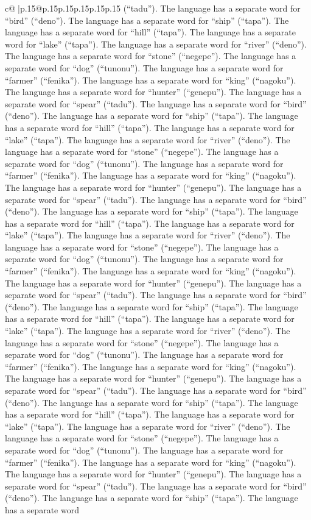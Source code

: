 \documentclass{article}
\begin{document}
{\begin{supertabular}{c@{$\;$}|p{.15\linewidth}@{}p{.15\linewidth}p{.15\linewidth}p{.15\linewidth}p{.15\linewidth}p{.15\linewidth}}
{{{(“tadu”). The language has a separate word for “bird” (“deno”). The language has a separate word for “ship” (“tapa”). The language has a separate word for “hill” (“tapa”). The language has a separate word for “lake” (“tapa”). The language has a separate word for “river” (“deno”). The language has a separate word for “stone” (“negepe”). The language has a separate word for “dog” (“tunonu”). The language has a separate word for “farmer” (“fenika”). The language has a separate word for “king” (“nagoku”). The language has a separate word for “hunter” (“genepu”). The language has a separate word for “spear” (“tadu”). The language has a separate word for “bird” (“deno”). The language has a separate word for “ship” (“tapa”). The language has a separate word for “hill” (“tapa”). The language has a separate word for “lake” (“tapa”). The language has a separate word for “river” (“deno”). The language has a separate word for “stone” (“negepe”). The language has a separate word for “dog” (“tunonu”). The language has a separate word for “farmer” (“fenika”). The language has a separate word for “king” (“nagoku”). The language has a separate word for “hunter” (“genepu”). The language has a separate word for “spear” (“tadu”). The language has a separate word for “bird” (“deno”). The language has a separate word for “ship” (“tapa”). The language has a separate word for “hill” (“tapa”). The language has a separate word for “lake” (“tapa”). The language has a separate word for “river” (“deno”). The language has a separate word for “stone” (“negepe”). The language has a separate word for “dog” (“tunonu”). The language has a separate word for “farmer” (“fenika”). The language has a separate word for “king” (“nagoku”). The language has a separate word for “hunter” (“genepu”). The language has a separate word for “spear” (“tadu”). The language has a separate word for “bird” (“deno”). The language has a separate word for “ship” (“tapa”). The language has a separate word for “hill” (“tapa”). The language has a separate word for “lake” (“tapa”). The language has a separate word for “river” (“deno”). The language has a separate word for “stone” (“negepe”). The language has a separate word for “dog” (“tunonu”). The language has a separate word for “farmer” (“fenika”). The language has a separate word for “king” (“nagoku”). The language has a separate word for “hunter” (“genepu”). The language has a separate word for “spear” (“tadu”). The language has a separate word for “bird” (“deno”). The language has a separate word for “ship” (“tapa”). The language has a separate word for “hill” (“tapa”). The language has a separate word for “lake” (“tapa”). The language has a separate word for “river” (“deno”). The language has a separate word for “stone” (“negepe”). The language has a separate word for “dog” (“tunonu”). The language has a separate word for “farmer” (“fenika”). The language has a separate word for “king” (“nagoku”). The language has a separate word for “hunter” (“genepu”). The language has a separate word for “spear” (“tadu”). The language has a separate word for “bird” (“deno”). The language has a separate word for “ship” (“tapa”). The language has a separate word }}}
\end{supertabular}}
\end{document}

